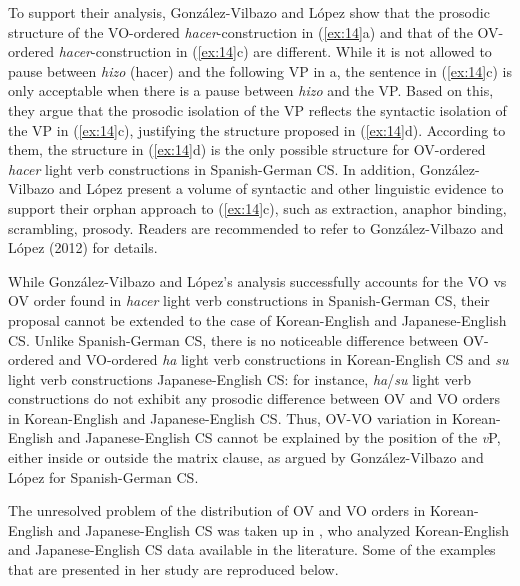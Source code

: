 To support their analysis, González-Vilbazo and López show that the prosodic structure of the \ac{VO}-ordered \textit{hacer}-construction in (\ref{ex:14}a) and that of the \ac{OV}-ordered \textit{hacer}-construction in (\ref{ex:14}c) are different. While it is not allowed to pause between \textit{hizo} (hacer) and the following \ac{VP} in a, the sentence in (\ref{ex:14}c) is only acceptable when there is a pause between \textit{hizo} and the \ac{VP}. Based on this, they argue that the prosodic isolation of the \ac{VP} reflects the syntactic isolation of the \ac{VP} in (\ref{ex:14}c), justifying the structure proposed in (\ref{ex:14}d). According to them, the structure in (\ref{ex:14}d) is the only possible structure for \ac{OV}-ordered \textit{hacer} light verb constructions in Spanish-German \ac{CS}. In addition, González-Vilbazo and López present a volume of syntactic and other linguistic evidence to support their orphan approach to (\ref{ex:14}c), such as extraction, anaphor binding, scrambling, prosody. Readers are recommended to refer to González-Vilbazo and López (2012) for details.

 While González-Vilbazo and López’s analysis successfully accounts for the \ac{VO} vs \ac{OV} order found in \textit{hacer} light verb constructions in Spanish-German \ac{CS}, their proposal cannot be extended to the case of Korean-English and Japanese-English \ac{CS}. Unlike Spanish-German \ac{CS}, there is no noticeable difference between \ac{OV}-ordered and \ac{VO}-ordered \textit{ha} light verb constructions in Korean-English \ac{CS} and \textit{su} light verb constructions Japanese-English \ac{CS}: for instance, \textit{ha}/\textit{su} light verb constructions do not exhibit any prosodic difference between \ac{OV} and \ac{VO} orders in Korean-English and Japanese-English \ac{CS}. Thus, \ac{OV}-\ac{VO} variation in Korean-English and Japanese-English \ac{CS} cannot be explained by the position of the \textit{v}P, either inside or outside the matrix clause, as argued by González-Vilbazo and López for Spanish-German \ac{CS}. 

The unresolved problem of the distribution of \ac{OV} and  \ac{VO} orders in Korean-English and Japanese-English \ac{CS} was taken up in \citet{Shim2011}, who analyzed Korean-English and Japanese-English \ac{CS} data available in the literature. Some of the examples that are presented in her study are reproduced below. 

